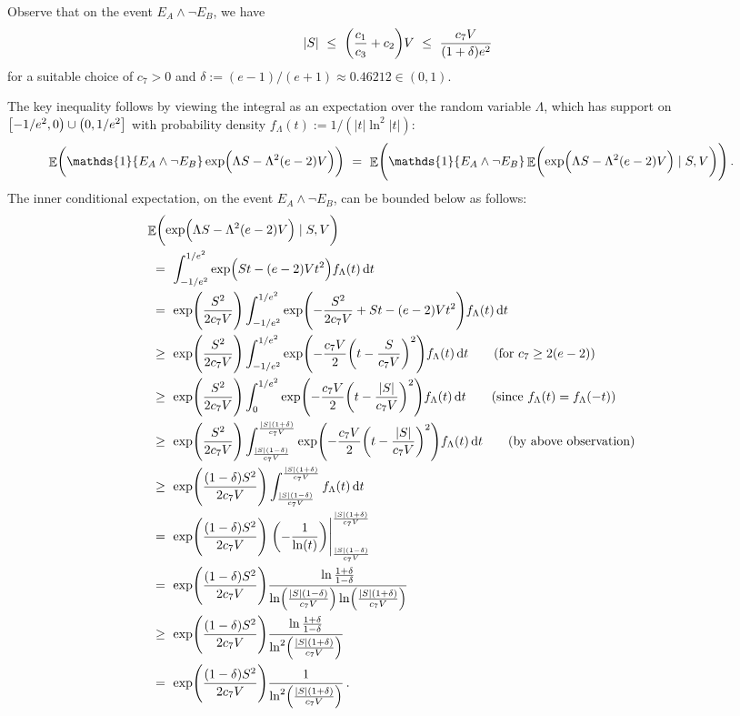 \documentclass[11pt]{article}
\DeclareMathOperator{\E}{\mathbb{E}}
\theoremstyle{remark}
\theoremstyle{definition}
\renewcommand\abs[1]{|#1|} %
\newcommand\ind[1]{\ensuremath{\mathds{1}\{#1\}}}
\newcommand\Parens[1]{\mleft(#1\mright)}
\begin{document}
Observe that on the event $E_A \wedge \neg E_B$, we have
\[
  |S|
  \ \leq \
  \Parens{
    \frac{c_1}{c_3} + c_2
  } V
  \ \leq \
  \frac{c_7V}{(1+\delta)e^2}
\]
for a suitable choice of $c_7>0$ and $\delta := (e-1)/(e+1) \approx
0.46212 \in (0,1)$.

The key inequality follows by viewing the integral as an expectation
over the random variable $\Lambda$, which has support on
$\intco{-1/e^2,0} \cup \intoc{0,1/e^2}$ with probability density
$f_\Lambda(t) := 1/(\abs{t}\ln^2\abs{t})$:
\begin{align*}
  \E\Parens{
    \ind{E_A \wedge \neg E_B}
    \exp\Parens{ \Lambda S - \Lambda^2 (e-2) V }
  }
  & \ = \
  \E\Parens{
    \ind{E_A \wedge \neg E_B}
    \E\Parens{
      \exp\Parens{ \Lambda S - \Lambda^2 (e-2) V }
      \mid S,V
    }
  }
  \,.
\end{align*}
The inner conditional expectation, on the event $E_A \wedge \neg E_B$,
can be bounded below as follows:
\begin{align*}
  \lefteqn{
    \E\Parens{
      \exp\Parens{ \Lambda S - \Lambda^2 (e-2) V }
      \mid S,V
    }
  } \\
  & \ = \
  \int_{-1/e^2}^{1/e^2}
  \exp\Parens{ S t - (e-2) V t^2 }
  f_\Lambda(t) \dif{t}
  \\
  & \ = \
  \exp\Parens{\frac{S^2}{2c_7V}}
  \int_{-1/e^2}^{1/e^2}
  \exp\Parens{
    -\frac{S^2}{2c_7V}
    + S t - (e-2) V t^2
  }
  f_\Lambda(t) \dif{t}
  \\
  & \ \geq \
  \exp\Parens{\frac{S^2}{2c_7V}}
  \int_{-1/e^2}^{1/e^2}
  \exp\Parens{
    -\frac{c_7V}{2}
    \Parens{ t - \frac{S}{c_7V} }^2
  }
  f_\Lambda(t) \dif{t}
  \qquad \text{(for $c_7 \geq 2(e-2)$)}
  \\
  & \ \geq \
  \exp\Parens{\frac{S^2}{2c_7V}}
  \int_0^{1/e^2}
  \exp\Parens{
    -\frac{c_7V}{2}
    \Parens{ t - \frac{|S|}{c_7V} }^2
  }
  f_\Lambda(t) \dif{t}
  \qquad \text{(since $f_\Lambda(t) = f_\Lambda(-t)$)}
  \\
  & \ \geq \
  \exp\Parens{\frac{S^2}{2c_7V}}
  \int_{\frac{|S|(1-\delta)}{c_7V}}^{\frac{|S|(1+\delta)}{c_7V}}
  \exp\Parens{
    -\frac{c_7V}{2}
    \Parens{ t - \frac{|S|}{c_7V} }^2
  }
  f_\Lambda(t) \dif{t}
  \qquad \text{(by above observation)}
  \\
  & \ \geq \
  \exp\Parens{\frac{(1-\delta)S^2}{2c_7V}}
  \int_{\frac{|S|(1-\delta)}{c_7V}}^{\frac{|S|(1+\delta)}{c_7V}}
  f_\Lambda(t) \dif{t}
  \\
  & \ = \
  \exp\Parens{\frac{(1-\delta)S^2}{2c_7V}}
  \left.
  \Parens{
    -\frac{1}{\ln(t)}
  }
  \right\vert_{\frac{|S|(1-\delta)}{c_7V}}^{\frac{|S|(1+\delta)}{c_7V}}
  \\
  & \ = \
  \exp\Parens{\frac{(1-\delta)S^2}{2c_7V}}
  \frac{\ln\frac{1+\delta}{1-\delta}}
  {\ln\Parens{\frac{|S|(1-\delta)}{c_7V}}\ln\Parens{\frac{|S|(1+\delta)}{c_7V}}}
  \\
  & \ \geq \
  \exp\Parens{\frac{(1-\delta)S^2}{2c_7V}}
  \frac{\ln\frac{1+\delta}{1-\delta}}
  {\ln^2\Parens{\frac{|S|(1+\delta)}{c_7V}}}
  \\
  & \ = \
  \exp\Parens{\frac{(1-\delta)S^2}{2c_7V}}
  \frac{1}{\ln^2\Parens{\frac{|S|(1+\delta)}{c_7V}}}
  \,.
\end{align*}
\end{document}
